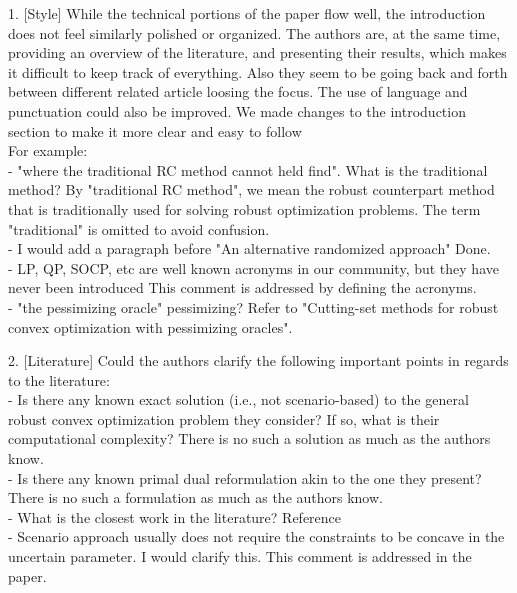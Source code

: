 \documentclass[journal,twoside,web]{ieeecolor}
\begin{document}
1. [Style]
While the technical portions of the paper flow well, the introduction does not feel similarly polished or organized. The authors are, at the same time, providing an overview of the literature, and presenting their results, which makes it difficult to keep track of everything. Also they seem to be going back and forth between different related article loosing the focus. The use of language and punctuation could also be improved. {\color{blue} We made changes to the introduction section to make it more clear and easy to follow}\\
For example:\\
- "where the traditional RC method cannot held find". What is the traditional method? {\color{blue} By "traditional RC method", we mean the robust counterpart method that is traditionally used for solving robust optimization problems. The term "traditional" is omitted to avoid confusion.}\\
- I would add a paragraph before "An alternative randomized approach" {\color{blue} Done.}\\
-  LP, QP, SOCP, etc are well known acronyms in our community, but they have never been introduced {\color{blue} This comment is addressed by defining the acronyms.}\\
- "the pessimizing oracle" pessimizing? {\color{blue} Refer to "Cutting-set methods for robust convex optimization with pessimizing oracles".}

2. [Literature]
Could the authors clarify the following important points in regards to the literature:\\
- Is there any known exact solution (i.e., not scenario-based) to the general robust convex optimization problem they consider? If so, what is their computational complexity? {\color{blue} There is no such a solution as much as the authors know.}\\
- Is there any known primal dual reformulation akin to the one they present? {\color{blue} There is no such a formulation as much as the authors know.}\\
- What is the closest work in the literature? {\color{blue} Reference \cite{cherukuri2016}}\\
- Scenario approach usually does not require the constraints to be concave in the uncertain parameter. I would clarify this. {\color{blue} This comment is addressed in the paper.}
\end{document}
